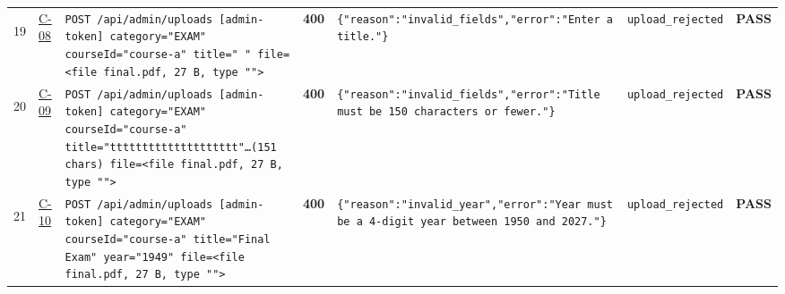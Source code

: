 \documentclass[10pt,a4paper]{article}
\begin{document}
\begin{landscape}
\begin{longtable}{@{}P{0.6cm}P{0.9cm}P{8.5cm}P{1.0cm}P{6.2cm}P{4.2cm}P{1.1cm}@{}}
\hypertarget{call19}{19} & \hyperlink{test-C-08}{C-08} & \texttt{POST /\allowbreak{}api/\allowbreak{}admin/\allowbreak{}uploads [admin-\allowbreak{}token] category=\allowbreak{}"\allowbreak{}EXAM"\allowbreak{} courseId=\allowbreak{}"\allowbreak{}course-\allowbreak{}a"\allowbreak{} title=\allowbreak{}"\allowbreak{}   "\allowbreak{} file=\allowbreak{}<file final.\allowbreak{}pdf,\allowbreak{} 27 B,\allowbreak{} type "\allowbreak{}"\allowbreak{}>} & \textcolor{warnamber}{\textbf{400}} & \texttt{\{"\allowbreak{}reason"\allowbreak{}:\allowbreak{}"\allowbreak{}invalid\_\allowbreak{}fields"\allowbreak{},\allowbreak{}"\allowbreak{}error"\allowbreak{}:\allowbreak{}"\allowbreak{}Enter a title.\allowbreak{}"\allowbreak{}\}} & \texttt{upload\_\allowbreak{}rejected} & \textcolor{passgreen}{\textbf{PASS}} \\
\hypertarget{call20}{20} & \hyperlink{test-C-09}{C-09} & \texttt{POST /\allowbreak{}api/\allowbreak{}admin/\allowbreak{}uploads [admin-\allowbreak{}token] category=\allowbreak{}"\allowbreak{}EXAM"\allowbreak{} courseId=\allowbreak{}"\allowbreak{}course-\allowbreak{}a"\allowbreak{} title=\allowbreak{}"\allowbreak{}tttttttttttttttttt\allowbreak{}tt"\allowbreak{}…(151 chars) file=\allowbreak{}<file final.\allowbreak{}pdf,\allowbreak{} 27 B,\allowbreak{} type "\allowbreak{}"\allowbreak{}>} & \textcolor{warnamber}{\textbf{400}} & \texttt{\{"\allowbreak{}reason"\allowbreak{}:\allowbreak{}"\allowbreak{}invalid\_\allowbreak{}fields"\allowbreak{},\allowbreak{}"\allowbreak{}error"\allowbreak{}:\allowbreak{}"\allowbreak{}Title must be 150 characters or fewer.\allowbreak{}"\allowbreak{}\}} & \texttt{upload\_\allowbreak{}rejected} & \textcolor{passgreen}{\textbf{PASS}} \\
\hypertarget{call21}{21} & \hyperlink{test-C-10}{C-10} & \texttt{POST /\allowbreak{}api/\allowbreak{}admin/\allowbreak{}uploads [admin-\allowbreak{}token] category=\allowbreak{}"\allowbreak{}EXAM"\allowbreak{} courseId=\allowbreak{}"\allowbreak{}course-\allowbreak{}a"\allowbreak{} title=\allowbreak{}"\allowbreak{}Final Exam"\allowbreak{} year=\allowbreak{}"\allowbreak{}1949"\allowbreak{} file=\allowbreak{}<file final.\allowbreak{}pdf,\allowbreak{} 27 B,\allowbreak{} type "\allowbreak{}"\allowbreak{}>} & \textcolor{warnamber}{\textbf{400}} & \texttt{\{"\allowbreak{}reason"\allowbreak{}:\allowbreak{}"\allowbreak{}invalid\_\allowbreak{}year"\allowbreak{},\allowbreak{}"\allowbreak{}error"\allowbreak{}:\allowbreak{}"\allowbreak{}Year must be a 4-\allowbreak{}digit year between 1950 and 2027.\allowbreak{}"\allowbreak{}\}} & \texttt{upload\_\allowbreak{}rejected} & \textcolor{passgreen}{\textbf{PASS}} \\

\end{longtable}
\end{landscape}
\end{document}
